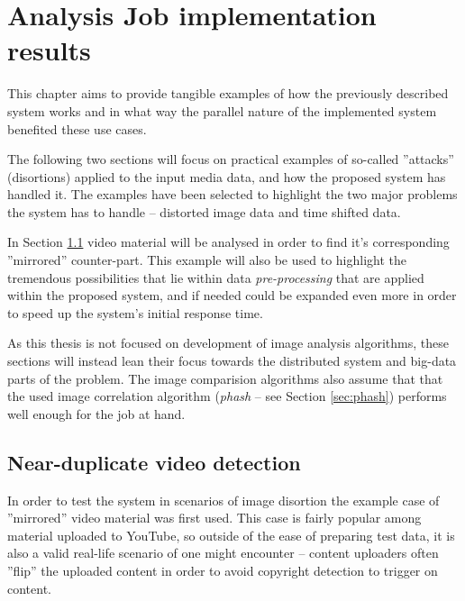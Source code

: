 \chapter{Analysis Job implementation results}
\label{chap:analysis-examples}

This chapter aims to provide tangible examples of how the previously described system works and in what way the parallel nature of the implemented system benefited these use cases.

The following two sections will focus on practical examples of so-called ''attacks'' (disortions) applied to the input media data, and how the proposed system has handled it. The examples have been selected to highlight the two major problems the system has to handle -- distorted image data and time shifted data.

In Section \ref{sec:mirrored-video-detection} video material will be analysed in order to find it's corresponding ''mirrored'' counter-part. This example will also be used to highlight the tremendous possibilities that lie within data \textit{pre-processing} that are applied within the proposed system, and if needed could be expanded even more in order to speed up the system's initial response time.


As this thesis is not focused on development of image analysis algorithms, these sections will instead lean their focus towards the distributed system and big-data parts of the problem. The image comparision algorithms also assume that that the used image correlation algorithm (\textit{phash} -- see Section \ref{sec:phash}) performs well enough for the job at hand. 

\section{Near-duplicate video detection}
\label{sec:mirrored-video-detection}
In order to test the system in scenarios of image disortion the example case of ''mirrored'' video material was first used. This case is fairly popular among material uploaded to YouTube, so outside of the ease of preparing test data, it is also a valid real-life scenario of one might encounter -- content uploaders often ''flip'' the uploaded content in order to avoid copyright detection to trigger on content.

